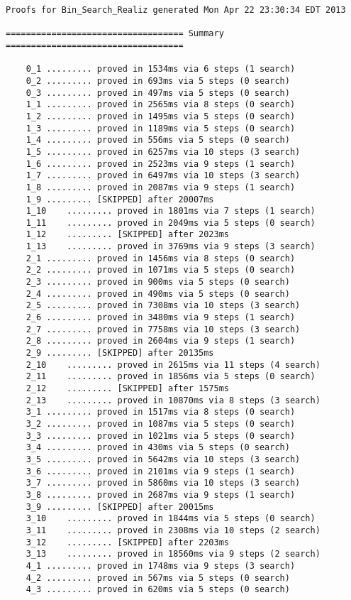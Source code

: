 \begin{lstlisting}[language=resolve]
Proofs for Bin_Search_Realiz generated Mon Apr 22 23:30:34 EDT 2013

=================================== Summary ===================================

	0_1	......... proved in 1534ms via 6 steps (1 search)
	0_2	......... proved in 693ms via 5 steps (0 search)
	0_3	......... proved in 497ms via 5 steps (0 search)
	1_1	......... proved in 2565ms via 8 steps (0 search)
	1_2	......... proved in 1495ms via 5 steps (0 search)
	1_3	......... proved in 1189ms via 5 steps (0 search)
	1_4	......... proved in 556ms via 5 steps (0 search)
	1_5	......... proved in 6257ms via 10 steps (3 search)
	1_6	......... proved in 2523ms via 9 steps (1 search)
	1_7	......... proved in 6497ms via 10 steps (3 search)
	1_8	......... proved in 2087ms via 9 steps (1 search)
	1_9	......... [SKIPPED] after 20007ms
	1_10	......... proved in 1801ms via 7 steps (1 search)
	1_11	......... proved in 2049ms via 5 steps (0 search)
	1_12	......... [SKIPPED] after 2023ms
	1_13	......... proved in 3769ms via 9 steps (3 search)
	2_1	......... proved in 1456ms via 8 steps (0 search)
	2_2	......... proved in 1071ms via 5 steps (0 search)
	2_3	......... proved in 900ms via 5 steps (0 search)
	2_4	......... proved in 490ms via 5 steps (0 search)
	2_5	......... proved in 7308ms via 10 steps (3 search)
	2_6	......... proved in 3480ms via 9 steps (1 search)
	2_7	......... proved in 7758ms via 10 steps (3 search)
	2_8	......... proved in 2604ms via 9 steps (1 search)
	2_9	......... [SKIPPED] after 20135ms
	2_10	......... proved in 2615ms via 11 steps (4 search)
	2_11	......... proved in 1856ms via 5 steps (0 search)
	2_12	......... [SKIPPED] after 1575ms
	2_13	......... proved in 10870ms via 8 steps (3 search)
	3_1	......... proved in 1517ms via 8 steps (0 search)
	3_2	......... proved in 1087ms via 5 steps (0 search)
	3_3	......... proved in 1021ms via 5 steps (0 search)
	3_4	......... proved in 430ms via 5 steps (0 search)
	3_5	......... proved in 5642ms via 10 steps (3 search)
	3_6	......... proved in 2101ms via 9 steps (1 search)
	3_7	......... proved in 5860ms via 10 steps (3 search)
	3_8	......... proved in 2687ms via 9 steps (1 search)
	3_9	......... [SKIPPED] after 20015ms
	3_10	......... proved in 1844ms via 5 steps (0 search)
	3_11	......... proved in 2308ms via 10 steps (2 search)
	3_12	......... [SKIPPED] after 2203ms
	3_13	......... proved in 18560ms via 9 steps (2 search)
	4_1	......... proved in 1748ms via 9 steps (3 search)
	4_2	......... proved in 567ms via 5 steps (0 search)
	4_3	......... proved in 620ms via 5 steps (0 search)


\end{lstlisting}
